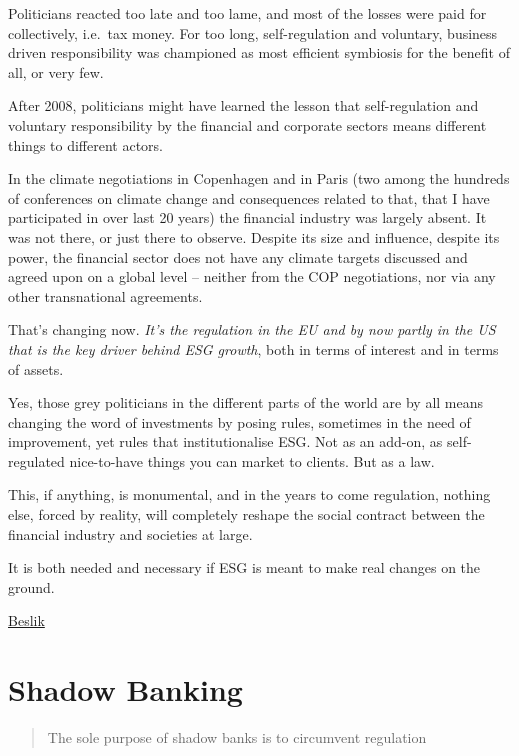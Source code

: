 \documentclass[
]{book}
\begin{document}
Politicians reacted too late and too lame, and most of the losses were paid for collectively, i.e.~tax money. For too long, self-regulation and voluntary, business driven responsibility was championed as most efficient symbiosis for the benefit of all, or very few.

After 2008, politicians might have learned the lesson that self-regulation and voluntary responsibility by the financial and corporate sectors means different things to different actors.

In the climate negotiations in Copenhagen and in Paris (two among the hundreds of conferences on climate change and consequences related to that, that I have participated in over last 20 years) the financial industry was largely absent. It was not there, or just there to observe. Despite its size and influence, despite its power, the financial sector does not have any climate targets discussed and agreed upon on a global level -- neither from the COP negotiations, nor via any other transnational agreements.

That's changing now. \emph{It's the regulation in the EU and by now partly in the US that is the key driver behind ESG growth}, both in terms of interest and in terms of assets.

Yes, those grey politicians in the different parts of the world are by all means changing the word of investments by posing rules, sometimes in the need of improvement, yet rules that institutionalise ESG. Not as an add-on, as self-regulated nice-to-have things you can market to clients. But as a law.

This, if anything, is monumental, and in the years to come regulation, nothing else, forced by reality, will completely reshape the social contract between the financial industry and societies at large.

It is both needed and necessary if ESG is meant to make real changes on the ground.

\href{https://esgonasunday.substack.com/p/week-19-esg-on-a-sunday-turns-1-}{Beslik}

\hypertarget{shadow-banking}{%
\chapter{Shadow Banking}\label{shadow-banking}}

\begin{quote}
The sole purpose of shadow banks is to circumvent regulation
\end{quote}
\end{document}
